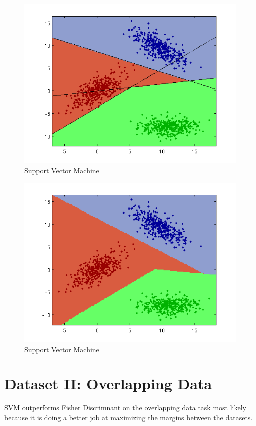 \documentclass[a4paper]{article}
\begin{document}
\begin{figure}[htbp!]
\center
\includegraphics[clip, trim=40px 15px 30px 10px]{perceptron.png}
\caption{Support Vector Machine}
\end{figure}
\pagebreak
\begin{figure}[htbp!]
\center
\includegraphics[clip, trim=40px 15px 30px 10px]{svm_c.png}
\caption{Support Vector Machine}
\end{figure}	

\pagebreak
\section{Dataset II: Overlapping Data}
SVM outperforms Fisher Discrimnant on the overlapping data task most likely because it is doing
a better job at maximizing the margins between the datasets.
\end{document}
